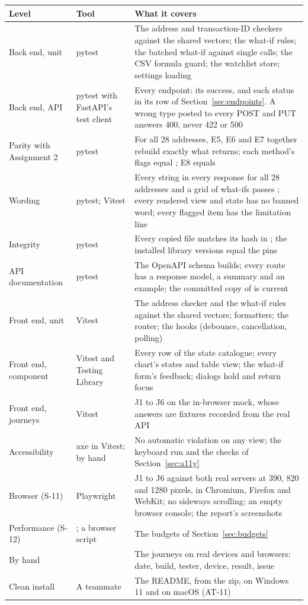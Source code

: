 {\small
\begin{longtable}{@{}L{2.5cm}L{2.2cm}L{9.4cm}@{}}
\toprule
\textbf{Level} & \textbf{Tool} & \textbf{What it covers} \\
\midrule
\endhead
Back end, unit & pytest & The address and transaction-ID checkers against the shared vectors; the what-if rules; the batched what-if against single calls; the CSV formula guard; the watchlist store; settings loading \\
Back end, API & pytest with FastAPI's test client & Every endpoint: its success, and each status in its row of Section~\ref{sec:endpoints}. A wrong type posted to every POST and PUT answers 400, never 422 or 500 \\
Parity with Assignment 2 & pytest & For all 28 addresses, E5, E6 and E7 together rebuild exactly what  returns; each method's flags equal ; E8 equals  \\
Wording & pytest; Vitest & Every string in every response for all 28 addresses and a grid of what-ifs passes ; every rendered view and state has no banned word; every flagged item has the limitation line \\
Integrity & pytest & Every copied file matches its hash in ; the installed library versions equal the pins \\
API documentation & pytest & The OpenAPI schema builds; every route has a response model, a summary and an example; the committed copy of  is current \\
Front end, unit & Vitest & The address checker and the what-if rules against the shared vectors; formatters; the router; the hooks (debounce, cancellation, polling) \\
Front end, component & Vitest and Testing Library & Every row of the state catalogue; every chart's states and table view; the what-if form's feedback; dialogs hold and return focus \\
Front end, journeys & Vitest & J1 to J6 on the in-browser mock, whose answers are fixtures recorded from the real API \\
Accessibility & axe in Vitest; by hand & No automatic violation on any view; the keyboard run and the checks of Section~\ref{sec:a11y} \\
Browser (S-11) & Playwright & J1 to J6 against both real servers at 390, 820 and 1280 pixels, in Chromium, Firefox and WebKit; no sideways scrolling; an empty browser console; the report's screenshots \\
Performance (S-12) & ; a browser script & The budgets of Section~\ref{sec:budgets} \\
By hand &  & The journeys on real devices and browsers: date, build, tester, device, result, issue \\
Clean install & A teammate & The README, from the zip, on Windows 11 and on macOS (AT-11) \\
\bottomrule
\end{longtable}
}

